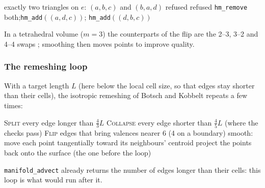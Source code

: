 \documentclass[10pt,a4paper]{article}
\theoremstyle{definition}
\newcommand{\fn}[1]{\texttt{#1}}
\begin{document}
\begin{algorithm}[H]
  \caption{\textsc{Flip}$(e = (a, b))$, $e$ inside a surface}
  \label{alg:flip}
  \begin{algorithmic}[1]
    \Require exactly two triangles on $e$: $(a, b, c)$ and $(b, a, d)$
    \If{\fn{hm\_find}$(1, (c, d)) \ne$ \fn{HM\_NONE}} \Return refused
    \EndIf
     \Return refused
    \EndIf
    \Statex {}
    \State \fn{hm\_remove} both;\quad \fn{hm\_add}$((a, d, c))$;\quad
      \fn{hm\_add}$((d, b, c))$
  \end{algorithmic}
\end{algorithm}

In a tetrahedral volume ($m = 3$) the counterparts of the flip are the
2--3, 3--2 and 4--4 swaps \cite{freitag}; smoothing then moves points to
improve quality.

\subsubsection{The remeshing loop}

With a target length $L$ (here below the local cell size, so that edges
stay shorter than their cells), the isotropic remeshing of Botsch and
Kobbelt \cite{botsch} repeats a few times:

\begin{algorithm}[H]
  \caption{\textsc{Remesh}$(L)$ \cite{botsch, hoppe}}
  \label{alg:remesh}
  \begin{algorithmic}[1]
      \State \textsc{Split} every edge longer than $\tfrac{4}{3} L$
      \State \textsc{Collapse} every edge shorter than $\tfrac{4}{5} L$
        (where the checks pass)
      \State \textsc{Flip} edges that bring valences nearer 6 (4 on a
        boundary)
      \State smooth: move each point tangentially toward its neighbours'
        centroid
      \State project the points back onto the surface (the one before the
        loop)
    \EndFor
  \end{algorithmic}
\end{algorithm}

\fn{manifold\_advect} already returns the number of edges longer than their
cells: this loop is what would run after it.

\end{document}
